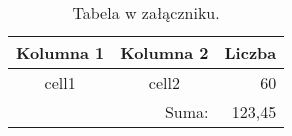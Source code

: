 \documentclass[
    bindingoffset=5mm,
    footnoteindent=3mm,
    hyphenation=true
]{template/wut-thesis}
\begin{document}
\clearpage
{}
\lipsum[1-2]
\begin{table}[!h] \centering
    \caption{Tabela w załączniku.}
    \begin{tabular} {| c | c | r |} \hline
        Kolumna 1       & Kolumna 2 & Liczba \\ \hline\hline
        cell1           & cell2     & 60     \\ \hline
        \multicolumn{2}{|r|}{Suma:} & 123,45 \\ \hline
    \end{tabular}
\end{table}
\lipsum[3-4]
\end{document}

